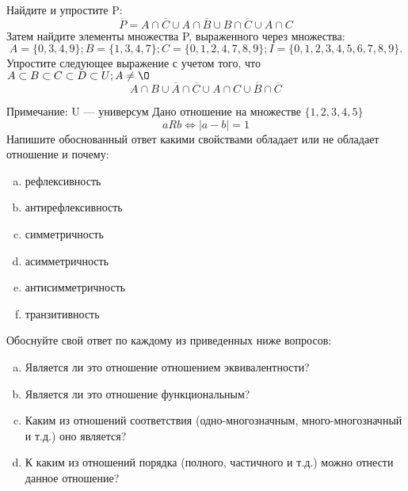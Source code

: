 \documentclass[10pt]{exam}
\begin{document}
\begin{questions}
\question
Найдите и упростите P:
\begin{equation*}
\overline{P} = A \cap \overline{C} \cup A \cap \overline{B} \cup B \cap \overline{C} \cup A \cap C
\end{equation*}
Затем найдите элементы множества P, выраженного через множества:
\begin{equation*}
A = \{0, 3, 4, 9\}; 
B = \{1, 3, 4, 7\};
C = \{0, 1, 2, 4, 7, 8, 9\};
I = \{0, 1, 2, 3, 4, 5, 6, 7, 8, 9\}.
\end{equation*}\question
Упростите следующее выражение с учетом того, что $A\subset B \subset C \subset D \subset U; A \neq \O$
\begin{equation*}
A \cap B \cup \overline{A} \cap \overline{C} \cup A \cap C \cup \overline{B} \cap \overline{C}
\end{equation*}

Примечание: U — универсум\question
Дано отношение на множестве $\{1, 2, 3, 4, 5\}$ 
\begin{equation*}
aRb \iff |a-b| = 1
\end{equation*}
Напишите обоснованный ответ какими свойствами обладает или не обладает отношение и почему:   
\begin{enumerate} [a)]\setcounter{enumi}{0}
\item рефлексивность
\item антирефлексивность
\item симметричность
\item асимметричность
\item антисимметричность
\item транзитивность
\end{enumerate}

Обоснуйте свой ответ по каждому из приведенных ниже вопросов:
\begin{enumerate} [a)]\setcounter{enumi}{0}
    \item Является ли это отношение отношением эквивалентности?
    \item Является ли это отношение функциональным?
    \item Каким из отношений соответствия (одно-многозначным, много-многозначный и т.д.) оно является?
    \item К каким из отношений порядка (полного, частичного и т.д.) можно отнести данное отношение?
\end{enumerate}


\end{questions}
\end{document}

